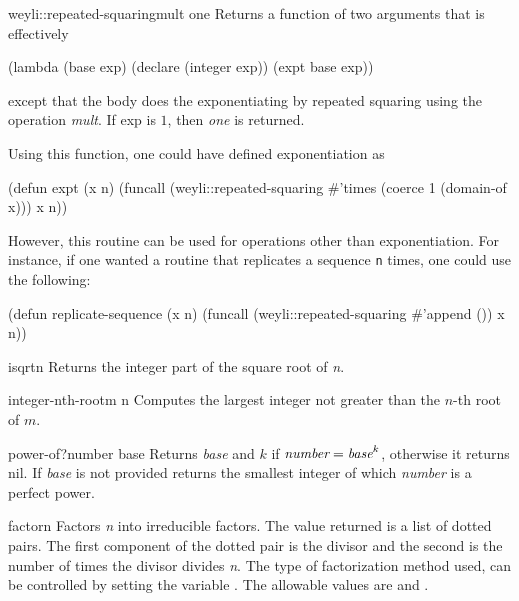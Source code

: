 \begin{functiondef}{weyli::repeated-squaring}{mult one}
Returns a function of two arguments that is effectively
\begin{code}
 (lambda (base exp) 
   (declare (integer exp))
   (expt base exp))
\end{code}
except that the body does the exponentiating by repeated squaring using
the operation {\em mult}.  If {\sf exp} is $1$, then {\em one} is
returned.
\end{functiondef}

Using this function, one could have defined exponentiation as
\begin{code}
(defun expt (x n)
  (funcall (weyli::repeated-squaring #'times (coerce 1 (domain-of x)))
           x n))
\end{code}
However, this routine can be used for operations other than
exponentiation.  For instance, if one wanted a routine that replicates
a sequence {\tt n} times, one could use the following:
\begin{code}
(defun replicate-sequence (x n)
  (funcall (weyli::repeated-squaring #'append ())
           x n))
\end{code}

\begin{functiondef}{isqrt}{n}
Returns the integer part of the square root of {\em n}.
\end{functiondef}

\begin{functiondef}{integer-nth-root}{m n}
Computes the largest integer not greater than the $n$-th root of $m$.
\end{functiondef}

\begin{functiondef}{power-of?}{number \optional{} base}
Returns {\em base} and $k$ if $\mbox{\em number} = \mbox{\em base}^k$,
otherwise it returns {\sf nil}.  If {\em base} is not provided returns
the smallest integer of which {\em number} is a perfect power.
\end{functiondef}


\begin{functiondef}{factor}{n}
Factors {\em n} into irreducible factors.  The value returned is a
list of dotted pairs.  The first component of the dotted pair is the
divisor and the second is the number of times the divisor divides {\em
n}.  The type of factorization method used, can be controlled by
setting the variable .  The allowable values are 
 and .
\end{functiondef}


